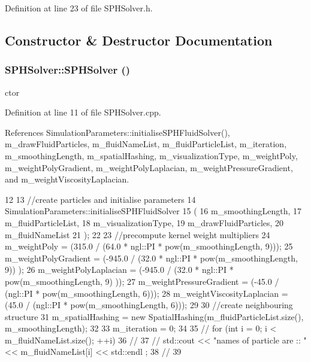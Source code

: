 Definition at line 23 of file SPHSolver.h.



\subsection{Constructor \& Destructor Documentation}
\hypertarget{class_s_p_h_solver_abe3a0bdf9c42b4213944bc0332020e65}{
\subsubsection[{SPHSolver}]{\setlength{\rightskip}{0pt plus 5cm}SPHSolver::SPHSolver ()}}
\label{class_s_p_h_solver_abe3a0bdf9c42b4213944bc0332020e65}


ctor 



Definition at line 11 of file SPHSolver.cpp.



References SimulationParameters::initialiseSPHFluidSolver(), m\_\-drawFluidParticles, m\_\-fluidNameList, m\_\-fluidParticleList, m\_\-iteration, m\_\-smoothingLength, m\_\-spatialHashing, m\_\-visualizationType, m\_\-weightPoly, m\_\-weightPolyGradient, m\_\-weightPolyLaplacian, m\_\-weightPressureGradient, and m\_\-weightViscosityLaplacian.




\begin{DoxyCode}
12 {
13     //create particles and initialise parameters
14     SimulationParameters::initialiseSPHFluidSolver
15             (
16                 m_smoothingLength,
17                 m_fluidParticleList,
18                 m_visualizationType,
19                 m_drawFluidParticles,
20                 m_fluidNameList
21             );
22 
23     //precompute kernel weight multipliers
24     m_weightPoly = (315.0 / (64.0 * ngl::PI * pow(m_smoothingLength, 9)));
25     m_weightPolyGradient = (-945.0 / (32.0 * ngl::PI * pow(m_smoothingLength, 9))
      );
26     m_weightPolyLaplacian = (-945.0 / (32.0 * ngl::PI * pow(m_smoothingLength, 9)
      ));
27     m_weightPressureGradient = (-45.0 / (ngl::PI * pow(m_smoothingLength, 6)));
28     m_weightViscosityLaplacian = (45.0 / (ngl::PI * pow(m_smoothingLength, 6)));
29 
30     //create neighbouring structure
31     m_spatialHashing = new SpatialHashing(m_fluidParticleList.size(), 
      m_smoothingLength);
32 
33     m_iteration = 0;
34 
35 //    for (int i = 0; i < m_fluidNameList.size(); ++i)
36 //    {
37 //    std::cout << "names of particle are :: " << m_fluidNameList[i] << std::endl
      ;
38 //    }
39 }
\end{DoxyCode}




